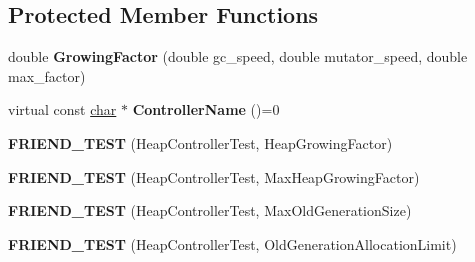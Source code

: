 \subsection*{Protected Member Functions}
\begin{DoxyCompactItemize}
\item 
\mbox{\label{classv8_1_1internal_1_1MemoryController_a6314af3e71162abfc24e00aa2761e98d}} 
double {\bfseries Growing\+Factor} (double gc\+\_\+speed, double mutator\+\_\+speed, double max\+\_\+factor)
\item 
\mbox{\label{classv8_1_1internal_1_1MemoryController_a0a6682eef131508992181c1cb1ca1b0e}} 
virtual const \mbox{\hyperlink{classchar}{char}} $\ast$ {\bfseries Controller\+Name} ()=0
\item 
\mbox{\label{classv8_1_1internal_1_1MemoryController_a53a7568bbd1c21194edb7aee6db2176d}} 
{\bfseries F\+R\+I\+E\+N\+D\+\_\+\+T\+E\+ST} (Heap\+Controller\+Test, Heap\+Growing\+Factor)
\item 
\mbox{\label{classv8_1_1internal_1_1MemoryController_a43483461d13408bcc361e77aac6193dc}} 
{\bfseries F\+R\+I\+E\+N\+D\+\_\+\+T\+E\+ST} (Heap\+Controller\+Test, Max\+Heap\+Growing\+Factor)
\item 
\mbox{\label{classv8_1_1internal_1_1MemoryController_a5ab8c0114c5fd23d0dd8f61f03d3c901}} 
{\bfseries F\+R\+I\+E\+N\+D\+\_\+\+T\+E\+ST} (Heap\+Controller\+Test, Max\+Old\+Generation\+Size)
\item 
\mbox{\label{classv8_1_1internal_1_1MemoryController_a1ad499786f57f3b2fb4d533c4df08d37}} 
{\bfseries F\+R\+I\+E\+N\+D\+\_\+\+T\+E\+ST} (Heap\+Controller\+Test, Old\+Generation\+Allocation\+Limit)
\end{DoxyCompactItemize}
